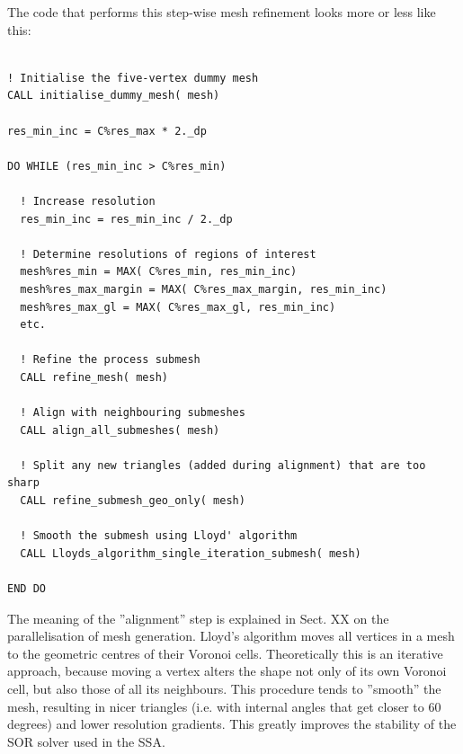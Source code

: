 \documentclass{article}
\begin{document}
The code that performs this step-wise mesh refinement looks more or less like this:

\begin{lstlisting}

! Initialise the five-vertex dummy mesh
CALL initialise_dummy_mesh( mesh)

res_min_inc = C%res_max * 2._dp

DO WHILE (res_min_inc > C%res_min)

  ! Increase resolution
  res_min_inc = res_min_inc / 2._dp

  ! Determine resolutions of regions of interest
  mesh%res_min = MAX( C%res_min, res_min_inc)
  mesh%res_max_margin = MAX( C%res_max_margin, res_min_inc)
  mesh%res_max_gl = MAX( C%res_max_gl, res_min_inc)
  etc.

  ! Refine the process submesh
  CALL refine_mesh( mesh)

  ! Align with neighbouring submeshes
  CALL align_all_submeshes( mesh)

  ! Split any new triangles (added during alignment) that are too sharp
  CALL refine_submesh_geo_only( mesh)
      
  ! Smooth the submesh using Lloyd' algorithm
  CALL Lloyds_algorithm_single_iteration_submesh( mesh)

END DO

\end{lstlisting}

The meaning of the ''alignment'' step is explained in Sect. XX on the parallelisation of mesh generation. Lloyd's algorithm moves all vertices in a mesh to the geometric centres of their Voronoi cells. Theoretically this is an iterative approach, because moving a vertex alters the shape not only of its own Voronoi cell, but also those of all its neighbours. This procedure tends to ''smooth'' the mesh, resulting in nicer triangles (i.e. with internal angles that get closer to 60 degrees) and lower resolution gradients. This greatly improves the stability of the SOR solver used in the SSA.
\end{document}

